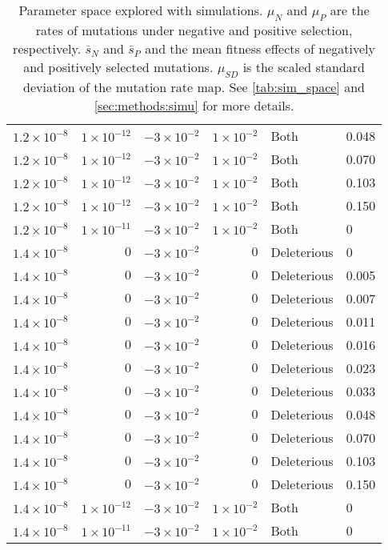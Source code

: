 \begin{table}
\begin{tabular}{rrrrll}
  $1.2 \times 10^{-8}$ & $1 \times 10^{-12}$ & $-3 \times 10^{-2}$ & $1 \times 10^{-2}$ & Both & 0.048 \\ 
  $1.2 \times 10^{-8}$ & $1 \times 10^{-12}$ & $-3 \times 10^{-2}$ & $1 \times 10^{-2}$ & Both & 0.070 \\ 
  $1.2 \times 10^{-8}$ & $1 \times 10^{-12}$ & $-3 \times 10^{-2}$ & $1 \times 10^{-2}$ & Both & 0.103 \\ 
  $1.2 \times 10^{-8}$ & $1 \times 10^{-12}$ & $-3 \times 10^{-2}$ & $1 \times 10^{-2}$ & Both & 0.150 \\ 
  $1.2 \times 10^{-8}$ & $1 \times 10^{-11}$ & $-3 \times 10^{-2}$ & $1 \times 10^{-2}$ & Both & 0 \\ 
  $1.4 \times 10^{-8}$ & $0$ & $-3 \times 10^{-2}$ & $0$ & Deleterious & 0 \\ 
  $1.4 \times 10^{-8}$ & $0$ & $-3 \times 10^{-2}$ & $0$ & Deleterious & 0.005 \\ 
  $1.4 \times 10^{-8}$ & $0$ & $-3 \times 10^{-2}$ & $0$ & Deleterious & 0.007 \\ 
  $1.4 \times 10^{-8}$ & $0$ & $-3 \times 10^{-2}$ & $0$ & Deleterious & 0.011 \\ 
  $1.4 \times 10^{-8}$ & $0$ & $-3 \times 10^{-2}$ & $0$ & Deleterious & 0.016 \\ 
  $1.4 \times 10^{-8}$ & $0$ & $-3 \times 10^{-2}$ & $0$ & Deleterious & 0.023 \\ 
  $1.4 \times 10^{-8}$ & $0$ & $-3 \times 10^{-2}$ & $0$ & Deleterious & 0.033 \\ 
  $1.4 \times 10^{-8}$ & $0$ & $-3 \times 10^{-2}$ & $0$ & Deleterious & 0.048 \\ 
  $1.4 \times 10^{-8}$ & $0$ & $-3 \times 10^{-2}$ & $0$ & Deleterious & 0.070 \\ 
  $1.4 \times 10^{-8}$ & $0$ & $-3 \times 10^{-2}$ & $0$ & Deleterious & 0.103 \\ 
  $1.4 \times 10^{-8}$ & $0$ & $-3 \times 10^{-2}$ & $0$ & Deleterious & 0.150 \\ 
  $1.4 \times 10^{-8}$ & $1 \times 10^{-12}$ & $-3 \times 10^{-2}$ & $1 \times 10^{-2}$ & Both & 0 \\ 
  $1.4 \times 10^{-8}$ & $1 \times 10^{-11}$ & $-3 \times 10^{-2}$ & $1 \times 10^{-2}$ & Both & 0 \\ 
   \hline
\end{tabular}
\caption{Parameter space explored with simulations. $\mu_N$ and $\mu_P$ are the rates of mutations under negative and positive selection, respectively.
$\bar{s}_N$ and $\bar{s}_P$ and the mean fitness effects of negatively and positively selected mutations. $\mu_{SD}$ is the scaled standard deviation of the mutation rate map. See \autoref{tab:sim_space} and \autoref{sec:methods:simu} for more details.} 
\label{tab:sim_params}
\end{table}



